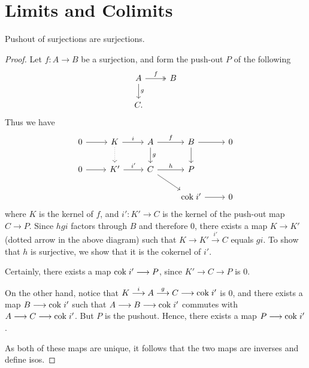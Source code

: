 \section{Limits and Colimits}
\begin{prop}\label{prop:pushout_epi}
Pushout of surjections are surjections.
\end{prop}

\begin{proof}
Let $f: A \to B$ be a surjection, and form the push-out $P$ of the 
following
\[
\begin{tikzcd}
A \arrow[twoheadrightarrow]{r}{f} \arrow{d}{g} &
B \\
C.
\end{tikzcd}
\]
Thus we have
\[
\begin{tikzcd}
0 \arrow{r} & 
K \arrow{r}{i}\arrow[dotted]{d} &
A \arrow{r}{f}\arrow{d}{g} &
B \arrow{r}\arrow{d}&
0 \\
0 \arrow{r} &
K' \arrow{r}{i'} &
C \arrow{r}{h} \arrow{rd}&
P \\
& & &\cok i' \arrow{r} &
0
\end{tikzcd}
\]
where $K$ is the kernel of $f$, and $i': K' \to C$ is the kernel 
of the push-out map $C \to P$. Since $hgi$ factors through $B$
and therefore $0$, there exists a map $K \to K'$ (dotted arrow
in the above diagram) such that $K \to K' \stackrel{i'}{\to} C$
equals $gi$. To show that $h$ is surjective, we show that it is 
the cokernel of $i'$.

Certainly, there exists a map $\mathrm{cok}\; i' \longrightarrow P$, since $K' \to C 
\to P$ is 0. 

On the other hand, notice that $K \stackrel{i}{\longrightarrow} A 
\stackrel{g}{\longrightarrow} C \longrightarrow \mathrm{cok}\; i'$ is 0, and there exists a map
$B \longrightarrow \mathrm{cok}\; i'$ such that $A \longrightarrow B \longrightarrow \mathrm{cok}\; i'$ commutes with
$A \longrightarrow C \longrightarrow \mathrm{cok}\; i'$. But $P$ is the pushout. Hence, there
exists a map $P \longrightarrow \mathrm{cok}\; i'$. 

As both of these maps are unique, it follows that the two maps
are inverses and define isos.
\end{proof}
